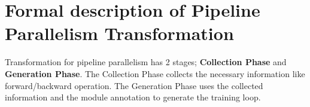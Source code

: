 \documentclass[sigplan, nonacm]{acmart}\settopmatter{printfolios=true,printccs=false,printacmref=false}
\begin{document}
 \section{Formal description of Pipeline Parallelism Transformation}\label{formalpipe}
Transformation for pipeline parallelism has 2 stages; \textbf{Collection Phase} and \textbf{Generation Phase}. The Collection Phase collects the necessary information like forward/backward operation. The Generation Phase uses the collected information and the module annotation to generate the training loop.\par
\end{document}
